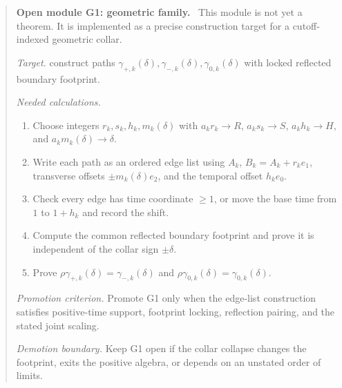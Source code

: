 \documentclass[11pt]{article}
\newenvironment{openmodule}[1]
{\begin{quote}\color{red!55!black}\textbf{Open module #1.}\ }
{\end{quote}}
\begin{document}
\begin{openmodule}{G1: geometric family}
This module is not yet a theorem. It is implemented as a precise construction target for a cutoff-indexed geometric collar.

\emph{Target.} construct paths \(\gamma_{+,k}(\delta),\gamma_{-,k}(\delta),\gamma_{0,k}(\delta)\) with locked reflected boundary footprint.

\emph{Needed calculations.}
\begin{enumerate}[label=(\alph*)]
  \item Choose integers \(r_k,s_k,h_k,m_k(\delta)\) with \(a_kr_k\to R\), \(a_ks_k\to S\), \(a_kh_k\to H\), and \(a_km_k(\delta)\to\delta\).
  \item Write each path as an ordered edge list using \(A_k\), \(B_k=A_k+r_ke_1\), transverse offsets \(\pm m_k(\delta)e_2\), and the temporal offset \(h_ke_0\).
  \item Check every edge has time coordinate \(\ge1\), or move the base time from \(1\) to \(1+h_k\) and record the shift.
  \item Compute the common reflected boundary footprint and prove it is independent of the collar sign \(\pm\delta\).
  \item Prove \(\rho\gamma_{+,k}(\delta)=\gamma_{-,k}(\delta)\) and \(\rho\gamma_{0,k}(\delta)=\gamma_{0,k}(\delta)\).
\end{enumerate}

\emph{Promotion criterion.} Promote G1 only when the edge-list construction satisfies positive-time support, footprint locking, reflection pairing, and the stated joint scaling.

\emph{Demotion boundary.} Keep G1 open if the collar collapse changes the footprint, exits the positive algebra, or depends on an unstated order of limits.
\end{openmodule}
\end{document}
